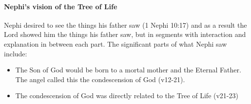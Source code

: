 \paragraph{Nephi's vision of the Tree of Life}
Nephi desired to see the things his father saw (1 Nephi 10:17) and as a result the Lord showed him the things his father saw, but in segments with interaction and explanation in between each part. The significant parts of what Nephi saw include:

\begin{itemize}
  \item{The Son of God would be born to a mortal mother and the Eternal Father. The angel called this the condescension of God (v12-21).}
  \item{The condescension of God was directly related to the Tree of Life (v21-23)}
\end{itemize}
